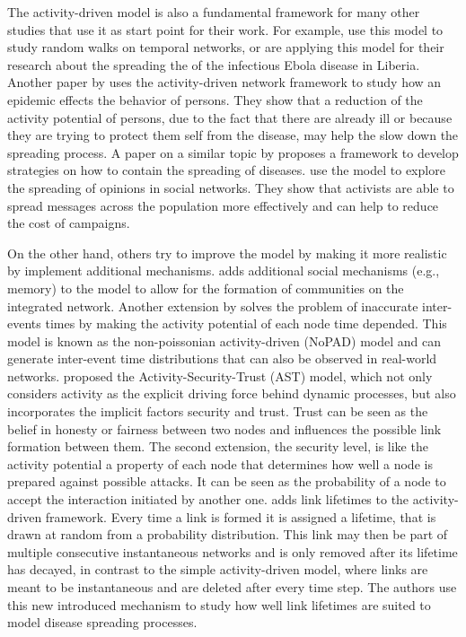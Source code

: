 The activity-driven model is also a fundamental framework for many other studies that use it as start point for their work.
For example, \citet{Perra2012b} use this model to study random walks on temporal networks, or \citet{Rizzo2016} are applying this model for their research about the spreading the of the infectious Ebola disease in Liberia.
Another paper by \citet{Rizzo2014} uses the activity-driven network framework to study how an epidemic effects the behavior of persons.
They show that a reduction of the activity potential of persons, due to the fact that there are already ill or because they are trying to protect them self from the disease, may help the slow down the spreading process.
A paper on a similar topic by \citet{Liu2014} proposes a framework to develop strategies on how to contain the spreading of diseases.
\citet{Mistry2015} use the model to explore the spreading of opinions in social networks.
They show that activists are able to spread messages across the population more effectively and can help to reduce the cost of campaigns.

On the other hand, others try to improve the model by making it more realistic by implement additional mechanisms.
\citet{Laurent2015} adds additional social mechanisms (e.g., memory) to the model to allow for the formation of communities on the integrated network.
Another extension by \citet{Moinet2015, Moinet2016} solves the problem of inaccurate inter-events times by making the activity potential of each node time depended.
This model is known as the non-poissonian activity-driven (NoPAD) model and can generate inter-event time distributions that can also be observed in real-world networks.
\citet{Wang2016} proposed the Activity-Security-Trust (AST) model, which not only considers activity as the explicit driving force behind dynamic processes, but also incorporates the implicit factors security and trust.
Trust can be seen as the belief in honesty or fairness between two nodes and influences the possible link formation between them.
The second extension, the security level, is like the activity potential a property of each node that determines how well a node is prepared against possible attacks.
It can be seen as the probability of a node to accept the interaction initiated by another one.
\citet{Sunny2015} adds link lifetimes to the activity-driven framework.
Every time a link is formed it is assigned a lifetime, that is drawn at random from a probability distribution.
This link may then be part of multiple consecutive instantaneous networks
and is only removed after its lifetime has decayed, in contrast to the simple activity-driven model, where links are meant to be instantaneous and are deleted after every time step.
The authors use this new introduced mechanism to study how well link lifetimes are suited to model disease spreading processes.


